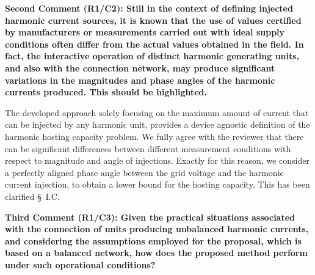 \documentclass[10pt]{article}
\begin{document}
\textbf{Second Comment (R1/C2): Still in the context of defining injected harmonic current sources, it is known that the use of values certified by manufacturers or measurements carried out with ideal supply conditions often differ from the actual values obtained in the field. In fact, the interactive operation of distinct harmonic generating units, and also with the connection network, may produce significant variations in the magnitudes and phase angles of the harmonic currents produced. This should be highlighted.}
\begin{tcolorbox}[colback=black!5!white,colframe=black]
The developed approach solely focusing on the maximum amount of current that can be injected by any harmonic unit, provides a device agnostic definition of the harmonic hosting capacity problem. We fully agree with the reviewer that there can be significant differences between different measurement conditions with respect to magnitude and angle of injections. Exactly for this reason, we consider a perfectly aligned phase angle between the grid voltage and the harmonic current injection, to obtain a lower bound for the hosting capacity. This has been clarified \S~I.C.

\end{tcolorbox}

\textbf{Third Comment (R1/C3): Given the practical situations associated with the connection of units producing unbalanced harmonic currents, and considering the assumptions employed for the proposal, which is based on a balanced network, how does the proposed method perform under such operational conditions?}
\end{document}
